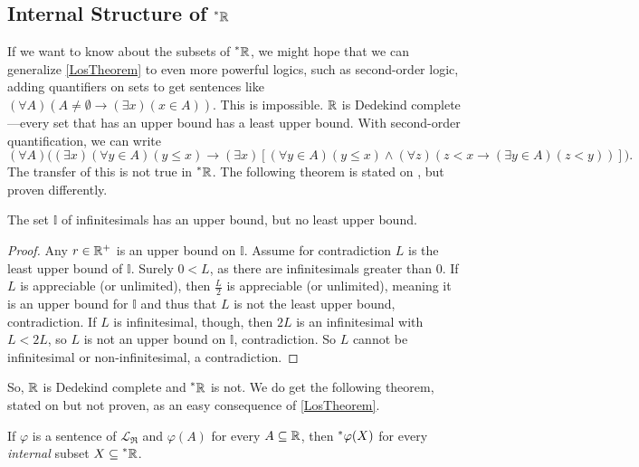 \subsection{Internal Structure of \texorpdfstring{$\prescript{*}{}{\mathbb{R}}$}{*R}}
If we want to know about the subsets of $\prescript{*}{}{\mathbb{R}}$, we might hope that we can generalize \autoref{LosTheorem} to even more powerful logics, such as second-order logic, adding quantifiers on sets to get sentences like $(\forall A)(A \neq \emptyset \to (\exists x)(x \in A))$. This is impossible. $\mathbb{R}$ is Dedekind complete---every set that has an upper bound has a least upper bound. With second-order quantification, we can write
\[ (\forall A)\big((\exists x)(\forall y \in A)(y \leq x) \to (\exists x)[(\forall y \in A)(y \leq x) \land (\forall z)(z < x \to (\exists y \in A)(z < y))]\big). \]
The transfer of this is not true in $\prescript{*}{}{\mathbb{R}}$. The following theorem is stated on \cite[140]{goldblatt1998}, but proven differently.

\begin{thm}\label{INoUpperBound}
    The set $\mathbb{I}$ of infinitesimals has an upper bound, but no least upper bound.
\end{thm}

\begin{proof}
    Any $r \in \mathbb{R}^+$ is an upper bound on $\mathbb{I}$. Assume for contradiction $L$ is the least upper bound of $\mathbb{I}$. Surely $0 < L$, as there are infinitesimals greater than $0$. If $L$ is appreciable (or unlimited), then $\frac{L}{2}$ is appreciable (or unlimited), meaning it is an upper bound for $\mathbb{I}$ and thus that $L$ is not the least upper bound, contradiction. If $L$ is infinitesimal, though, then $2L$ is an infinitesimal with $L < 2L$, so $L$ is not an upper bound on $\mathbb{I}$, contradiction. So $L$ cannot be infinitesimal or non-infinitesimal, a contradiction.
\end{proof}
So, $\mathbb{R}$ is Dedekind complete and $\prescript{*}{}{\mathbb{R}}$ is not. We do get the following theorem, stated on \cite[133]{goldblatt1998} but not proven, as an easy consequence of \autoref{LosTheorem}.

\begin{thm}
    If $\varphi$ is a sentence of $\mathcal{L}_\mathfrak{R}$ and $\varphi(A)$ for every $A \subseteq \mathbb{R}$, then $\prescript{*}{}{\varphi}(X)$ for every \textit{internal} subset $X \subseteq \prescript{*}{}{\mathbb{R}}$.
\end{thm}

